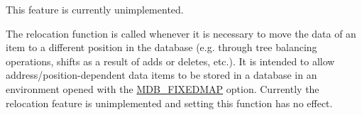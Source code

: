 
\begin{DoxyRefList}
\item[\label{todo__todo000001}%
\Hypertarget{todo__todo000001}%
Member \mbox{\hyperlink{group__mdb_ga311e8b7d73c5e7c03b625a894c5014cb}{M\+D\+B\+\_\+rel\+\_\+func}} (\mbox{\hyperlink{struct_m_d_b__val}{M\+D\+B\+\_\+val}} $\ast$item, void $\ast$oldptr, void $\ast$newptr, void $\ast$relctx)]This feature is currently unimplemented.  
\item[\label{todo__todo000002}%
\Hypertarget{todo__todo000002}%
Member \mbox{\hyperlink{group__internal_ga697d82c7afe79f142207ad5adcdebfeb}{mdb\+\_\+set\+\_\+relfunc}} (\mbox{\hyperlink{struct_m_d_b__txn}{M\+D\+B\+\_\+txn}} $\ast$txn, M\+D\+B\+\_\+dbi dbi, M\+D\+B\+\_\+rel\+\_\+func $\ast$rel)]The relocation function is called whenever it is necessary to move the data of an item to a different position in the database (e.\+g. through tree balancing operations, shifts as a result of adds or deletes, etc.). It is intended to allow address/position-\/dependent data items to be stored in a database in an environment opened with the \mbox{\hyperlink{group__mdb__env_ga492952277c481bc4a6fa08ef71c29487}{M\+D\+B\+\_\+\+F\+I\+X\+E\+D\+M\+AP}} option. Currently the relocation feature is unimplemented and setting this function has no effect. 
\end{DoxyRefList}